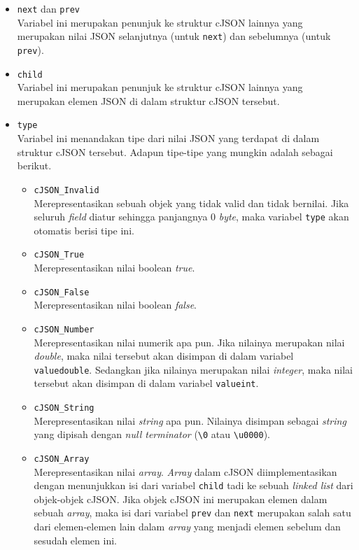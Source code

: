 \begin{itemize}
	\item \verb|next| dan \verb|prev|\\
	Variabel ini merupakan penunjuk ke struktur cJSON lainnya yang merupakan nilai JSON selanjutnya (untuk \verb|next|) dan sebelumnya (untuk \verb|prev|).
	\item \verb|child|\\
	Variabel ini merupakan penunjuk ke struktur cJSON lainnya yang merupakan elemen JSON di dalam struktur cJSON tersebut.
	\item \verb|type|\\
	Variabel ini menandakan tipe dari nilai JSON yang terdapat di dalam struktur cJSON tersebut. Adapun tipe-tipe yang mungkin adalah sebagai berikut.
	
	\begin{itemize}
		\item \verb|cJSON_Invalid|\\
		Merepresentasikan sebuah objek yang tidak valid dan tidak bernilai. Jika seluruh \textit{field} diatur sehingga panjangnya 0 \textit{byte}, maka variabel \verb|type| akan otomatis berisi tipe ini.
		\item \verb|cJSON_True|\\
		Merepresentasikan nilai boolean \textit{true}.
		\item \verb|cJSON_False|\\
		Merepresentasikan nilai boolean \textit{false}.
		\item \verb|cJSON_Number|\\
		Merepresentasikan nilai numerik apa pun. Jika nilainya merupakan nilai \textit{double}, maka nilai tersebut akan disimpan di dalam variabel \verb|valuedouble|. Sedangkan jika nilainya merupakan nilai \textit{integer}, maka nilai tersebut akan disimpan di dalam variabel \verb|valueint|.
		\item \verb|cJSON_String|\\
		Merepresentasikan nilai \textit{string} apa pun. Nilainya disimpan sebagai \textit{string} yang dipisah dengan \textit{null terminator} (\textquotesingle\verb|\0|\textquotesingle\xspace atau \verb|\u0000|).
		\item \verb|cJSON_Array|\\
		Merepresentasikan nilai \textit{array}. \textit{Array} dalam cJSON diimplementasikan dengan menunjukkan isi dari variabel \verb|child| tadi ke sebuah \textit{linked list} dari objek-objek cJSON. Jika objek cJSON ini merupakan elemen dalam sebuah \textit{array}, maka isi dari variabel \verb|prev| dan \verb|next| merupakan salah satu dari elemen-elemen lain dalam \textit{array} yang menjadi elemen sebelum dan sesudah elemen ini.

\end{itemize}
\end{itemize}

